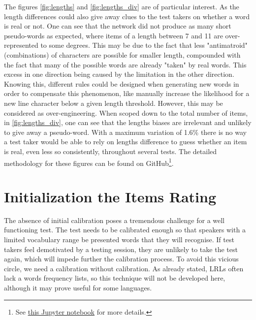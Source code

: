 The figures \ref{fig:lengths} and \ref{fig:lengths_div} are of particular interest. As the length differences could also give away clues to the test takers on whether a word is real or not. One can see that the network did not produce as many short pseudo-words as expected, where items of a length between 7 and 11 are over-represented to some degrees. This may be due to the fact that less "antimatroid" (combinations) of characters are possible for smaller length, compounded with the fact that many of the possible words are already "taken" by real words. This excess in one direction being caused by the limitation in the other direction. Knowing this, different rules could be designed when generating new words in order to compensate this phenomenon, like manually increase the likelihood for a new line character below a given length threshold. However, this may be considered as over-engineering. When scoped down to the total number of items, in \ref{fig:lengths_div}, one can see that the lengths biases are irrelevant and unlikely to give away a pseudo-word. With a maximum variation of 1.6\% there is no way a test taker would be able to rely on lengths difference to guess whether an item is real, even less so consistently, throughout several tests. The detailed methodology for these figures can be found on GitHub\footnote{See \href{https://github.com/Oktogazh/sudogen/blob/master/4\%20Testing.ipynb}{this Jupyter notebook} for more details.}.


\section{Initialization the Items Rating}
The absence of initial calibration poses a tremendous challenge for a well functioning test. The test needs to be calibrated enough so that speakers with a limited vocabulary range be presented words that they will recognise. If test takers feel demotivated by a testing session, they are unlikely to take the test again, which will impede further the calibration process. To avoid this vicious circle, we need a calibration without calibration. As already stated, LRLs often lack a words frequency lists, so this technique will not be developed here, although it may prove useful for some languages.

